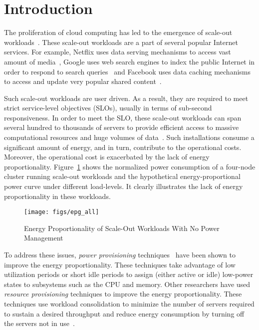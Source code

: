 \documentclass{sig-alternate}
\begin{document}
\section{Introduction}

The proliferation of cloud computing has led to the emergence of 
scale-out workloads~\cite{clearingcloud, cloudsuite}. These scale-out workloads are a part of several 
popular Internet services. For example, Netflix uses data serving mechanisms 
to access vast amount of media~\cite{cassandraweb}, Google uses web search engines 
to index the public Internet in order to respond to search queries~\cite{googlews} 
and Facebook uses data caching mechanisms to access and update
very popular shared content~\cite{fbmc}. 


Such scale-out workloads are user driven. As a result, they are required to 
meet strict service-level objectives (SLOs), usually in terms 
of sub-second responsiveness. In order to meet the SLO, 
these scale-out workloads can span several hundred to thousands of servers 
to provide efficient access to massive computational resources and huge volumes of data~\cite{wsc}. 
Such installations consume a significant amount of energy, and in turn, contribute to the 
operational costs. Moreover, the operational cost is exacerbated by the lack of energy 
proportionality. Figure~\ref{fig:epgall} shows the normalized 
power consumption of a four-node cluster running scale-out workloads and the 
hypothetical energy-proportional power curve under different load-levels. It 
clearly illustrates the lack of energy proportionality in these workloads. 


\begin{figure}[h]
\centering
\texttt{[image: figs/epg\_all]}
\caption{Energy Proportionality of Scale-Out Workloads With No Power Management}
\label{fig:epgall}
\end{figure}



To address these issues, \emph{power
  provisioning} techniques~\cite{ccgrid_eprop, pegasus, icpe_eprop, coscale, memscale} 
  have been shown to improve the energy proportionality.
These techniques take advantage of low utilization periods or short
idle periods to assign (either active or idle) low-power states to subsystems such as the CPU 
and memory. Other researchers have used \emph{resource provisioning} techniques 
to improve the energy proportionality.
These techniques use workload consolidation to minimize the number of
servers required to sustain a desired throughput and reduce energy
consumption by turning off the servers not in
use~\cite{hpca_knightshift}.
\end{document}
